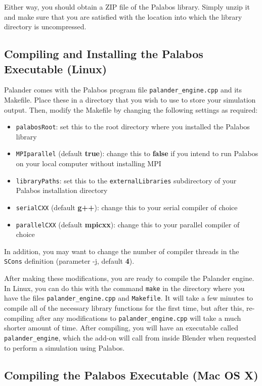 \documentclass[12pt]{article}
\begin{document}
Either way, you should obtain a ZIP file of the Palabos library. Simply unzip it and make sure that you are 
satisfied with the location into which the library directory is uncompressed.

\subsection{Compiling and Installing the Palabos Executable (Linux)} \label{install_linux}

Palander comes with the Palabos program file \verb|palander_engine.cpp| and its Makefile. Place these in a 
directory that you wish to use to store your simulation output. Then, modify the Makefile by changing the 
following settings as required:
\begin{itemize}
\item \verb|palabosRoot|: set this to the root directory where you installed the Palabos library
\item \verb|MPIparallel| (default {\bf true}): change this to {\bf false} if you intend to run Palabos on 
your local computer without installing MPI
\item \verb|libraryPaths|: set this to the \verb|externalLibraries| subdirectory of your Palabos installation 
directory
\item \verb|serialCXX| (default {\bf g++}): change this to your serial compiler of choice
\item \verb|parallelCXX| (default {\bf mpicxx}): change this to your parallel compiler of choice
\end{itemize}
In addition, you may want to change the number of compiler threads in the \verb|SCons| definition (parameter 
-j, default {\bf 4}).

After making these modifications, you are ready to compile the Palander engine. In Linux, you can do this 
with the command \verb|make| in the directory where you have the files \verb|palander_engine.cpp| and 
\verb|Makefile|. It will take a few minutes to compile all of the necessary library functions for the first 
time, but after this, re-compiling after any modifications to \verb|palander_engine.cpp| will take a much 
shorter amount of time. After compiling, you will have an executable called \verb|palander_engine|, which the 
add-on will call from inside Blender when requested to perform a simulation using Palabos.

\subsection{Compiling the Palabos Executable (Mac OS X)}
\end{document}
